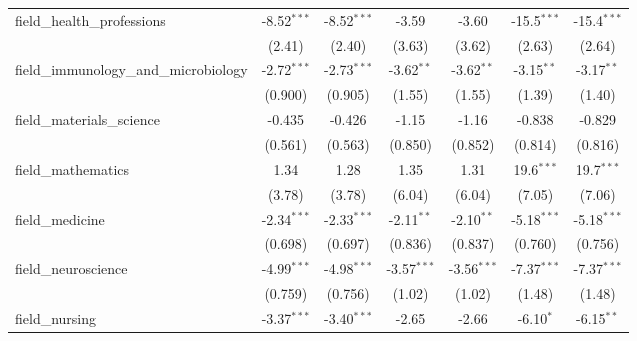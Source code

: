 \begin{tabular}{lcccccc}
   field\_health\_professions                                  & -8.52$^{***}$ & -8.52$^{***}$ & -3.59         & -3.60         & -15.5$^{***}$ & -15.4$^{***}$\\   
                                                               & (2.41)        & (2.40)        & (3.63)        & (3.62)        & (2.63)        & (2.64)\\   
   field\_immunology\_and\_microbiology                        & -2.72$^{***}$ & -2.73$^{***}$ & -3.62$^{**}$  & -3.62$^{**}$  & -3.15$^{**}$  & -3.17$^{**}$\\   
                                                               & (0.900)       & (0.905)       & (1.55)        & (1.55)        & (1.39)        & (1.40)\\   
   field\_materials\_science                                   & -0.435        & -0.426        & -1.15         & -1.16         & -0.838        & -0.829\\   
                                                               & (0.561)       & (0.563)       & (0.850)       & (0.852)       & (0.814)       & (0.816)\\   
   field\_mathematics                                          & 1.34          & 1.28          & 1.35          & 1.31          & 19.6$^{***}$  & 19.7$^{***}$\\   
                                                               & (3.78)        & (3.78)        & (6.04)        & (6.04)        & (7.05)        & (7.06)\\   
   field\_medicine                                             & -2.34$^{***}$ & -2.33$^{***}$ & -2.11$^{**}$  & -2.10$^{**}$  & -5.18$^{***}$ & -5.18$^{***}$\\   
                                                               & (0.698)       & (0.697)       & (0.836)       & (0.837)       & (0.760)       & (0.756)\\   
   field\_neuroscience                                         & -4.99$^{***}$ & -4.98$^{***}$ & -3.57$^{***}$ & -3.56$^{***}$ & -7.37$^{***}$ & -7.37$^{***}$\\   
                                                               & (0.759)       & (0.756)       & (1.02)        & (1.02)        & (1.48)        & (1.48)\\   
   field\_nursing                                              & -3.37$^{***}$ & -3.40$^{***}$ & -2.65         & -2.66         & -6.10$^{*}$   & -6.15$^{**}$\\   

\end{tabular}
